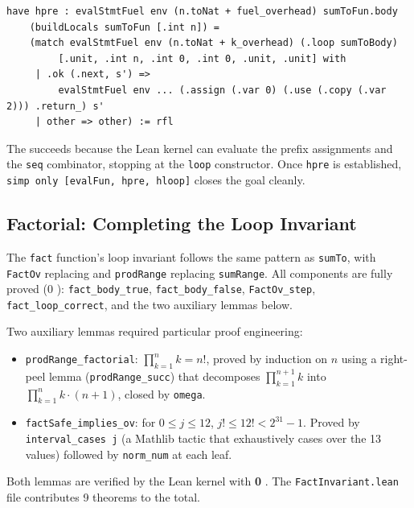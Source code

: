 \begin{lstlisting}[caption={hpre technique for prefix reduction.},label={lst:hpre}]
have hpre : evalStmtFuel env (n.toNat + fuel_overhead) sumToFun.body
    (buildLocals sumToFun [.int n]) =
    (match evalStmtFuel env (n.toNat + k_overhead) (.loop sumToBody)
         [.unit, .int n, .int 0, .int 0, .unit, .unit] with
     | .ok (.next, s') =>
         evalStmtFuel env ... (.assign (.var 0) (.use (.copy (.var 2))) .return_) s'
     | other => other) := rfl
\end{lstlisting}

The \rfl succeeds because the Lean kernel can evaluate the prefix assignments
and the \texttt{seq} combinator, stopping at the \texttt{loop} constructor.
Once \texttt{hpre} is established, \texttt{simp only [evalFun, hpre, hloop]}
closes the goal cleanly.

\subsection{Factorial: Completing the Loop Invariant}

The \texttt{fact} function's loop invariant follows the same pattern as
\texttt{sumTo}, with \texttt{FactOv} replacing \SumToOv and
\texttt{prodRange} replacing \texttt{sumRange}. All components are
fully proved (0 \sorry): \texttt{fact\_body\_true}, \texttt{fact\_body\_false},
\texttt{FactOv\_step}, \texttt{fact\_loop\_correct}, and the two auxiliary
lemmas below.

Two auxiliary lemmas required particular proof engineering:

\begin{itemize}[leftmargin=1.5em]
  \item \texttt{prodRange\_factorial}: $\prod_{k=1}^{n} k = n!$, proved by
        induction on $n$ using a right-peel lemma
        (\texttt{prodRange\_succ}) that decomposes $\prod_{k=1}^{n+1} k$
        into $\prod_{k=1}^{n} k \cdot (n+1)$, closed by \texttt{omega}.
  \item \texttt{factSafe\_implies\_ov}: for $0 \le j \le 12$,
        $j! \le 12! < 2^{31} - 1$. Proved by \texttt{interval\_cases j}
        (a Mathlib tactic that exhaustively cases over the 13 values)
        followed by \texttt{norm\_num} at each leaf.
\end{itemize}

Both lemmas are verified by the Lean kernel with \textbf{0 \sorry}.
The \texttt{FactInvariant.lean} file contributes 9 theorems to the total.

